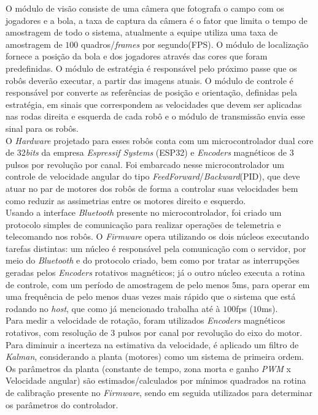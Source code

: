 O módulo de visão consiste de uma câmera que fotografa o campo com os jogadores e a bola, a taxa de captura da câmera é o fator que limita o tempo de amostragem de todo o sistema, atualmente a equipe utiliza uma taxa de amostragem de $100$ quadros/\emph{frames} por segundo(FPS). O módulo de localização fornece a posição da bola e dos jogadores através das cores que foram predefinidas. O módulo de estratégia é responsável pelo próximo passe que os robôs deverão executar, a partir das imagens atuais. O módulo de controle é responsável por converte as referências de posição e orientação, definidas pela estratégia, em sinais que correspondem as velocidades que devem ser aplicadas nas rodas direita e esquerda de cada robô e o módulo de transmissão envia esse sinal para os robôs.\\

O \textit{Hardware} projetado para esses robôs conta com um microcontrolador dual core de 32\emph{bits} da empresa \emph{Espressif Systems} (ESP32) e \textit{Encoders} magnéticos de $3$ pulsos por revolução por canal. Foi embarcado  nesse microcontrolador um controle de velocidade angular do tipo  \textit{FeedForward}/\textit{Backward}(PID), que deve atuar no par de motores dos robôs de  forma a controlar suas velocidades bem como reduzir as assimetrias entre  os motores direito e esquerdo.\\

Usando a interface \textit{Bluetooth} presente no microcontrolador, foi criado um  protocolo simples de comunicação para realizar operações de telemetria e telecomando nos robôs. O \textit{Firmware} opera utilizando os dois núcleos  executando tarefas distintas: um núcleo é responsável pela comunicação  com o servidor, por meio do \textit{Bluetooth} e do protocolo criado, bem como  por tratar as interrupções geradas pelos \textit{Encoders} rotativos magnéticos;  já o outro núcleo executa a rotina de controle, com um período de amostragem de pelo menos $5$ms, para operar em uma frequência de pelo menos duas vezes mais rápido que o sistema que está rodando no \emph{host}, que como já mencionado trabalha até à $100$fps ($10$ms).\\

Para medir a velocidade de rotação, foram utilizados \textit{Encoders} magnéticos  rotativos, com resolução de $3$ pulsos por canal por revolução do eixo do motor. Para diminuir a  incerteza na estimativa da velocidade, é aplicado um filtro de \textit{Kalman},  considerando a planta (motores) como um sistema de primeira ordem. Os  parâmetros da planta (constante de tempo, zona morta e ganho \emph{PWM} x  Velocidade angular) são estimados/calculados por mínimos quadrados na  rotina de calibração presente no \textit{Firmware}, sendo em seguida utilizados  para determinar os parâmetros do controlador.


